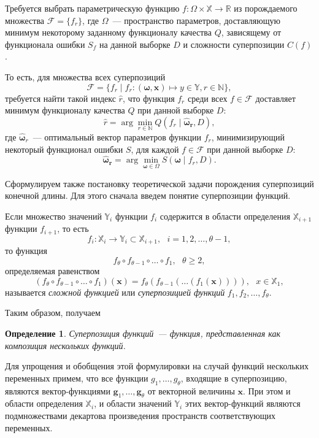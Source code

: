 \documentclass[12pt,a4paper]{article}
\newtheorem{defin}{Определение}
\begin{document}
Требуется выбрать параметрическую функцию
$f : \Omega \times \mathbb{X} \rightarrow \mathbb{R}$ из
порождаемого множества $\mathcal{F} = \{ f_r \}$, где $\Omega$~--- пространство
параметров, доставляющую минимум некоторому заданному функционалу качества $Q$,
зависящему от функционала ошибки $S_f$ на данной выборке $D$ и сложности суперпозиции $C(f)$.

То есть, для множества всех суперпозиций
\[
\mathcal{F} = \{ f_r \mid
			f_r : (\boldsymbol{\omega}, \mathbf{x}) \mapsto y \in \mathbb{Y},
			r \in \mathbb{N} \},
\]
требуется найти такой индекс $\hat{r}$, что функция $f_r$ среди всех
$f \in \mathcal{F}$ доставляет минимум функционалу качества $Q$ при данной
выборке $D$:
\begin{equation}
  \label{eq:hat_r}
  \hat{r} = \arg \min_{r \in \mathbb{N}} Q (f_r \mid \boldsymbol{\hat{\omega}_r}, D),
\end{equation}
где $\boldsymbol{\hat{\omega}}_r$~--- оптимальный вектор параметров функции
$f_r$, минимизирующий некоторый функционал ошибки $S$, для каждой $f \in \mathcal{F}$ при данной выборке $D$:
\begin{equation}
  \label{eq:hat_omega_generate}
  \boldsymbol{\hat{\omega}_r} = \arg \min_{\boldsymbol{\omega} \in \Omega} S(\boldsymbol{\omega} \mid f_r, D).
\end{equation}

Сформулируем также постановку теоретической задачи порождения суперпозиций
конечной длины. Для этого сначала введем понятие суперпозиции функций.

Если множество значений $\mathbb{Y}_i$ функции $f_i$ содержится в области
определения $\mathbb{X}_{i+1}$ функции $f_{i+1}$, то есть
\[
f_i : \mathbb{X}_i \to \mathbb{Y}_i \subset \mathbb{X}_{i+1}, ~~~ i = 1, 2, \dots, \theta - 1,
\]
то функция
\[
f_\theta \circ f_{\theta-1} \circ \dots \circ f_1, ~~~ \theta \geq 2,
\]
определяемая равенством
\[
(f_\theta \circ f_{\theta-1} \circ \dots \circ f_1) (\mathbf{x}) =
  f_{\theta} (f_{\theta-1} (\dots (f_1 (\mathbf{x})))), ~~~ x \in \mathbb{X}_1,
\]
называется \emph{сложной функцией} \cite{MathEnc1984_4} или
\emph{суперпозицией функций} $f_1, f_2, \dots, f_\theta$.

Таким образом, получаем
\begin{defin}
  Суперпозиция функций~--- функция, представленная как композиция нескольких
  функций. 
\end{defin}

Для упрощения и обобщения этой формулировки на случай функций нескольких
переменных примем, что все функции $g_1, \dots, g_\theta$, входящие в
суперпозицию, являются вектор-функциями $\mathbf{g}_1, \dots, \mathbf{g}_\theta$
от векторной величины $\mathbf{x}$. При этом и области определения
$\mathbb{X}_i$, и области значений $\mathbb{Y}_i$ этих вектор-функций являются
подмножествами декартова произведения пространств соответствующих переменных.
\end{document}

